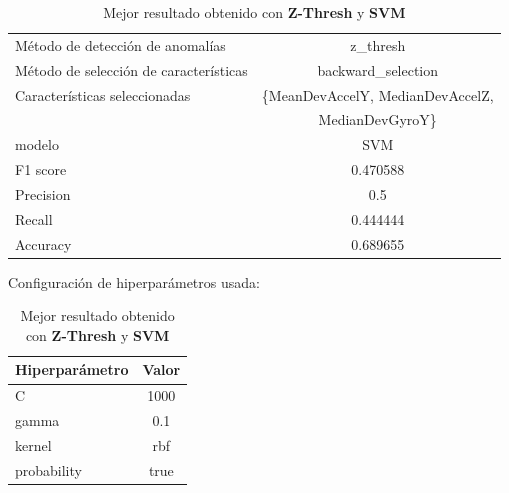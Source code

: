 \begin{appendices}
		\begin{table}[htb]
			\caption{Mejor resultado obtenido con \textbf{Z-Thresh} y \textbf{SVM}}
			\label{table:25}
			\centering
			\begin{tabular}{lc}
				\toprule
				\midrule
					  Método de detección de anomalías &                                         z\_thresh \\
				Método de selección de características &                               backward\_selection  \\
						 Características seleccionadas & \{MeanDevAccelY, MedianDevAccelZ,  \\
						 							   &                                MedianDevGyroY\}  \\
												modelo &                                              SVM  \\
											  F1 score &                                         0.470588 \\
											 Precision &                                              0.5 \\
												Recall &                                         0.444444 \\
											  Accuracy &                                         0.689655 \\
				\bottomrule
			\end{tabular}
			\newline
			\newline
			Configuración de hiperparámetros usada:
			\begin{tabular}{lc}
				\toprule
				Hiperparámetro & Valor \\
				\midrule
							 C &  1000 \\
						 gamma &   0.1 \\
						kernel &   rbf \\
				   probability &  true \\
				\bottomrule
			\end{tabular}
			
		\end{table}


\end{appendices}
